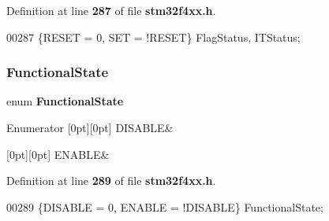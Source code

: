 Definition at line \textbf{ 287} of file \textbf{ stm32f4xx.\+h}.


\begin{DoxyCode}
00287 \{RESET = 0, SET = !RESET\} FlagStatus, ITStatus;
\end{DoxyCode}
\mbox{\label{group__Exported__types_gac9a7e9a35d2513ec15c3b537aaa4fba1}} 
\subsubsection{Functional\+State}
{\footnotesize\ttfamily enum \textbf{ Functional\+State}}

\begin{DoxyEnumFields}{Enumerator}
[0pt][0pt]{}\mbox{\label{group__Exported__types_ggac9a7e9a35d2513ec15c3b537aaa4fba1ad3a9df141be0ccf10389b640f492b26d}} 
D\+I\+S\+A\+B\+LE&\\
\hline

[0pt][0pt]{}\mbox{\label{group__Exported__types_ggac9a7e9a35d2513ec15c3b537aaa4fba1a7d46875fa3ebd2c34d2756950eda83bf}} 
E\+N\+A\+B\+LE&\\
\hline

\end{DoxyEnumFields}


Definition at line \textbf{ 289} of file \textbf{ stm32f4xx.\+h}.


\begin{DoxyCode}
00289 \{DISABLE = 0, ENABLE = !DISABLE\} FunctionalState;
\end{DoxyCode}
